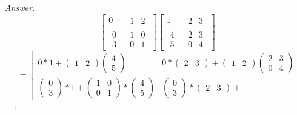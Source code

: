 \documentclass{amsbook}
\theoremstyle{definition}
\theoremstyle{remark}
\numberwithin{section}{chapter}
\numberwithin{equation}{chapter}
\begin{document}
\begin{proof}[Answer]
\[
\left[
\begin{array}{c|c}
0&\begin{matrix}1&2\end{matrix}\\\hline
\begin{matrix}0\\3\end{matrix}&\begin{matrix}
1&0\\0&1\end{matrix}
\end{array}
\right]
\left[
\begin{array}{c|c}
1&\begin{matrix}2&3\end{matrix}\\\hline
\begin{matrix}4\\5\end{matrix}&\begin{matrix}
2&3\\0&4\end{matrix}
\end{array}
\right]
\]
\[
=\left[
\begin{array}{c|c}
0*1+\begin{pmatrix}1&2\end{pmatrix}\begin{pmatrix}4\\5\end{pmatrix}&
0*\begin{pmatrix}2&3\end{pmatrix}+\begin{pmatrix}1&2\end{pmatrix}\begin{pmatrix}
2&3\\0&4\end{pmatrix}\\\hline
\begin{pmatrix}0\\3\end{pmatrix}*1+\begin{pmatrix}
1&0\\0&1\end{pmatrix}*\begin{pmatrix}4\\5\end{pmatrix}&
\begin{pmatrix}0\\3\end{pmatrix}*\begin{pmatrix}2&3\end{pmatrix}+

\end{array}\]
\end{proof}
\end{document}
